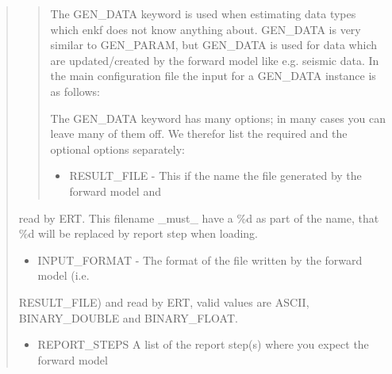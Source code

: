 \documentclass[a4paper,10pt,english]{sphinxmanual}
\begin{document}
\begin{sphinxShadowBox}
\begin{quote}
\begin{quote}

The GEN\_DATA keyword is used when estimating data types which enkf does not
know anything about. GEN\_DATA is very similar to GEN\_PARAM, but GEN\_DATA is
used for data which are updated/created by the forward model like e.g. seismic
data. In the main configuration file the input for a GEN\_DATA instance is as
follows:

%
\begin{sphinxVerbatim}[commandchars=\\\{\}]
              
\end{sphinxVerbatim}

The GEN\_DATA keyword has many options; in many cases you can leave many of
them off. We therefor list the required and the optional options separately:

\begin{itemize}
\item {} 
RESULT\_FILE - This if the name the file generated by the forward model and

\end{itemize}
\end{quote}

read by ERT. This filename \_must\_ have a \%d as part of the name, that \%d
will be replaced by report step when loading.
\begin{itemize}
\item {} 
INPUT\_FORMAT - The format of the file written by the forward model (i.e.

\end{itemize}

RESULT\_FILE) and read by ERT, valid values are ASCII, BINARY\_DOUBLE and
BINARY\_FLOAT.
\begin{itemize}
\item {} 
REPORT\_STEPS A list of the report step(s) where you expect the forward model


\end{itemize}
\end{quote}
\end{sphinxShadowBox}
\end{document}
